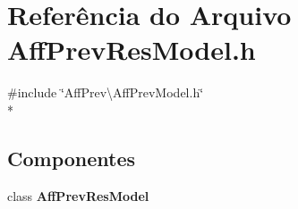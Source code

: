 \section{Referência do Arquivo Aff\+Prev\+Res\+Model.\+h}
\label{_aff_prev_res_model_8h}
{\ttfamily \#include \char`\"{}Aff\+Prev\textbackslash{}\+Aff\+Prev\+Model.\+h\char`\"{}}\\*
\subsection*{Componentes}
\begin{DoxyCompactItemize}
\item 
class {\bf Aff\+Prev\+Res\+Model}
\end{DoxyCompactItemize}
